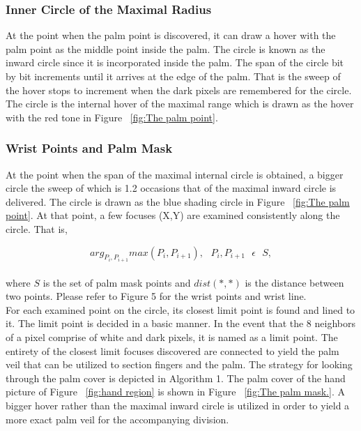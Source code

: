 \documentclass[a4paper]{article}
\begin{document}
\subsubsection{Inner Circle of the Maximal Radius}
At the point when the palm point is discovered, it can draw a hover with the palm point as the middle point inside the palm. The circle is known as the inward circle since it is incorporated inside the palm. The span of the circle bit by bit increments until it arrives at the edge of the palm. That is the sweep of the hover stops to increment when the dark pixels are remembered for the circle. The circle is the internal hover of the maximal range which is drawn as the hover with the red tone in Figure ~\ref{fig:The palm point}.

\subsubsection{Wrist Points and Palm Mask}
At the point when the span of the maximal internal circle is obtained, a bigger circle the sweep of which is 1.2 occasions that of the maximal inward circle is delivered. The circle is drawn as the blue shading circle in Figure ~\ref{fig:The palm point}. At that point, a few focuses (X,Y) are examined consistently along the circle. That is,

\begin{equation}
{arg_{P_{i},P_{i+1}}max(P_{i},P_{i+1})},\textrm{  } {P_{i},P_{i+1}} \textrm{  } \epsilon \textrm{  } S,
\end{equation}
\\
where $S$ is the set of palm mask points and $dist(*,*)$ is the distance between two points. Please refer to Figure 5 for the wrist points and wrist line.
\\
For each examined point on the circle, its closest limit point is found and lined to it. The limit point is decided in a basic manner. In the event that the 8 neighbors of a pixel comprise of white and dark pixels, it is named as a limit point. The entirety of the closest limit focuses discovered are connected to yield the palm veil that can be utilized to section fingers and the palm. The strategy for looking through the palm cover is depicted in Algorithm 1. The palm cover of the hand picture of Figure ~\ref{fig:hand region} is shown in Figure ~\ref{fig:The palm mask.}. A bigger hover rather than the maximal inward circle is utilized in order to yield a more exact palm veil for the accompanying division.
\end{document}
